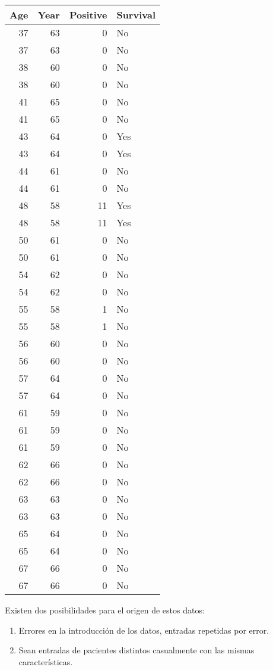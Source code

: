\documentclass[
]{article}
\providecommand{\tightlist}{%
  \setlength{\itemsep}{0pt}\setlength{\parskip}{0pt}}
\begin{document}
\begin{tabular}{r|r|r|l}
\hline
Age & Year & Positive & Survival\\
\hline
37 & 63 & 0 & No\\
\hline
37 & 63 & 0 & No\\
\hline
38 & 60 & 0 & No\\
\hline
38 & 60 & 0 & No\\
\hline
41 & 65 & 0 & No\\
\hline
41 & 65 & 0 & No\\
\hline
43 & 64 & 0 & Yes\\
\hline
43 & 64 & 0 & Yes\\
\hline
44 & 61 & 0 & No\\
\hline
44 & 61 & 0 & No\\
\hline
48 & 58 & 11 & Yes\\
\hline
48 & 58 & 11 & Yes\\
\hline
50 & 61 & 0 & No\\
\hline
50 & 61 & 0 & No\\
\hline
54 & 62 & 0 & No\\
\hline
54 & 62 & 0 & No\\
\hline
55 & 58 & 1 & No\\
\hline
55 & 58 & 1 & No\\
\hline
56 & 60 & 0 & No\\
\hline
56 & 60 & 0 & No\\
\hline
57 & 64 & 0 & No\\
\hline
57 & 64 & 0 & No\\
\hline
61 & 59 & 0 & No\\
\hline
61 & 59 & 0 & No\\
\hline
61 & 59 & 0 & No\\
\hline
62 & 66 & 0 & No\\
\hline
62 & 66 & 0 & No\\
\hline
63 & 63 & 0 & No\\
\hline
63 & 63 & 0 & No\\
\hline
65 & 64 & 0 & No\\
\hline
65 & 64 & 0 & No\\
\hline
67 & 66 & 0 & No\\
\hline
67 & 66 & 0 & No\\
\hline
\end{tabular}

Existen dos posibilidades para el origen de estos datos:

\begin{enumerate}
\def\labelenumi{\arabic{enumi}.}
\tightlist
\item
  Errores en la introducción de los datos, entradas repetidas por error.
\item
  Sean entradas de pacientes distintos casualmente con las mismas
  características.
\end{enumerate}
\end{document}
